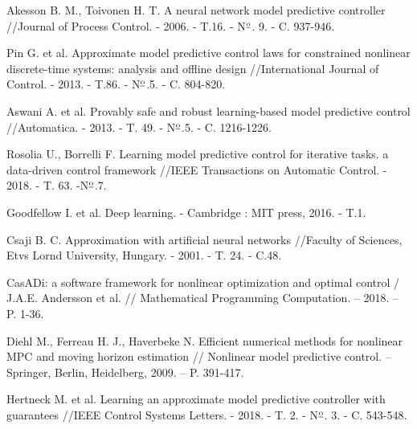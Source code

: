 \begin{biblio}
Akesson B. M., Toivonen H. T. A neural network model predictive controller //Journal of Process Control. - 2006. - T.16. - N$\textsuperscript{\underline{o}}$. 9. - C. 937-946.

Pin G. et al. Approximate model predictive control laws for constrained nonlinear discrete-time systems: analysis and offline design //International Journal of Control. - 2013. - T.86. - N$\textsuperscript{\underline{o}}$.5. - C. 804-820.

Aswani A. et al. Provably safe and robust learning-based model predictive control //Automatica. - 2013. - T. 49. - N$\textsuperscript{\underline{o}}$.5. - C. 1216-1226.

Rosolia U., Borrelli F. Learning model predictive control for iterative tasks. a data-driven control framework //IEEE Transactions on Automatic Control. - 2018. - T. 63. -N$\textsuperscript{\underline{o}}$.7.

Goodfellow I. et al. Deep learning. - Cambridge : MIT press, 2016. - T.1.

Csaji B. C. Approximation with artificial neural networks //Faculty of Sciences, Etvs Lornd University, Hungary. - 2001. - T. 24. - C.48.

CasADi: a software framework for nonlinear optimization and optimal control / J.A.E. Andersson  et al. // Mathematical Programming Computation. -- 2018. -- P. 1-36.

Diehl M., Ferreau H. J., Haverbeke N. Efficient numerical methods for nonlinear MPC and moving horizon estimation // Nonlinear model predictive control. -- Springer, Berlin, Heidelberg, 2009. -- P. 391-417.

Hertneck M. et al. Learning an approximate model predictive controller with guarantees //IEEE Control Systems Letters. - 2018. - T. 2. - N$\textsuperscript{\underline{o}}$. 3. - C. 543-548.

\end{biblio} 